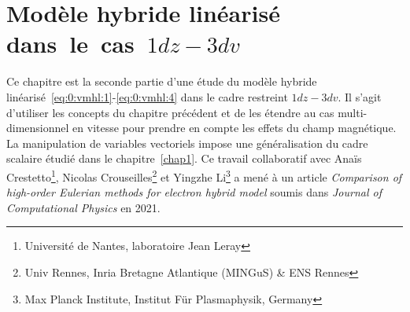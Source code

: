 \renewcommand{\localPath}{chap3}

\chapter{Modèle hybride linéarisé dans~le~cas~$1dz-3dv$}
\label{chap3}

Ce chapitre est la seconde partie d'une étude du modèle hybride linéarisé~\eqref{eq:0:vmhl:1}-\eqref{eq:0:vmhl:4} dans le cadre restreint $1dz-3dv$. Il s'agit d'utiliser les concepts du chapitre précédent et de les étendre au cas multi-dimensionnel en vitesse pour prendre en compte les effets du champ magnétique. La manipulation de variables vectoriels impose une généralisation du cadre scalaire étudié dans le chapitre~\ref{chap1}. Ce travail collaboratif avec Anaïs Crestetto\footnote{Université de Nantes, laboratoire Jean Leray}, Nicolas Crouseilles\footnote{Univ Rennes, Inria Bretagne Atlantique (MINGuS) \& ENS Rennes} et Yingzhe Li\footnote{Max Planck Institute, Institut Für Plasmaphysik, Germany} a mené à un article \emph{Comparison of high-order Eulerian methods for electron hybrid model} soumis dans \emph{Journal of Computational Physics} en 2021.









